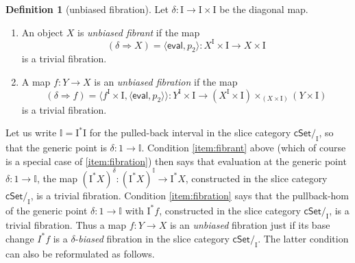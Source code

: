 \documentclass[12pt]{article}
\newcommand{\cSet}{\ensuremath{\mathsf{cSet}}}
\newcommand{\ra}{\ensuremath{\rightarrow}}
\renewcommand{\to}{\ensuremath{\rightarrow}}
\newcommand{\I}{\ensuremath{\mathrm{I}}}
\newcommand{\II}{\ensuremath{\mathbb{I}}}
\theoremstyle{remark}
\theoremstyle{definition}
\newtheorem{definition}[theorem]{Definition}
\begin{document}
\begin{definition}[unbiased fibration]\label{def:unbiasedfibration}
Let $\delta : \I\ra\I\times\I$ be the diagonal map.
\begin{enumerate}
\item\label{item:fibrant} An object $X$ is  \emph{unbiased fibrant} if the map 
\[
(\delta\Rightarrow\! X) = \langle\mathsf{eval}, p_2\rangle : X^\I \times \I \ra X\times \I
\]
is a trivial fibration. 
\item\label{item:fibration} A map $f : Y\ra X$ is an \emph{unbiased fibration} if the map 
\[
(\delta\Rightarrow\! f) = \langle f^\I\times \I, \langle \mathsf{eval},p_2 \rangle\rangle: Y^\I\times \I \ra (X^\I \times \I)\times_{(X\times \I)} (Y\times\I)
\]
is a trivial fibration.
\end{enumerate}
\end{definition}

%
Let us write $\II = \I^*\I$ for the pulled-back interval in the slice category $\cSet/_\I$, so that the generic point is $\delta : 1 \to \II$.
Condition \eqref{item:fibrant} above (which of course is a special case of \eqref{item:fibration}) then says that evaluation at the generic point $\delta : 1\ra \II$, the map $(\I^*X)^\delta: (\I^*X)^\II \ra \I^*X$, constructed in the slice category $\cSet/_\I$, is a trivial fibration.  
Condition \eqref{item:fibration} says that the pullback-hom of the generic point $\delta : 1\ra \II$ with $\I^*f$, constructed in the slice category $\cSet/_\I$, is a trivial fibration.  Thus a map $f: Y\to X$ is an \emph{unbiased} fibration just if its base change $I^*f$  is a $\delta$-\emph{biased} fibration in the slice category $\cSet/_\I$.  The latter condition can also be reformulated as follows.
\end{document}
